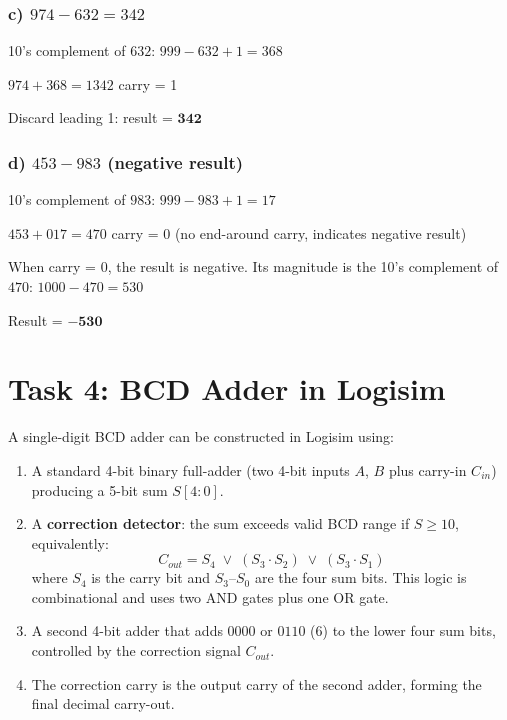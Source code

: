 \documentclass[12pt,a4paper]{article}
\begin{document}
\subsubsection*{c) \quad $974 - 632 = 342$}

10's complement of $632$: \quad $999 - 632 + 1 = 368$

$974 + 368 = 1342$ \quad carry = 1

Discard leading 1: result = $\mathbf{342}$

\subsubsection*{d) \quad $453 - 983$ (negative result)}

10's complement of $983$: \quad $999 - 983 + 1 = 17$

$453 + 017 = 470$ \quad carry = 0 (no end-around carry, indicates negative result)

When carry = 0, the result is negative. Its magnitude is the 10's complement
of $470$: \quad $1000 - 470 = 530$

Result = $\mathbf{-530}$

\newpage

\section{Task 4: BCD Adder in Logisim}

A single-digit BCD adder can be constructed in Logisim using:

\begin{enumerate}
  \item A standard 4-bit binary full-adder (two 4-bit inputs $A$, $B$ plus
        carry-in $C_{in}$) producing a 5-bit sum $S[4:0]$.
  \item A \textbf{correction detector}: the sum exceeds valid BCD range if
        $S \geq 10$, equivalently:
        \[ C_{out} = S_4 \;\vee\; (S_3 \cdot S_2) \;\vee\; (S_3 \cdot S_1) \]
        where $S_4$ is the carry bit and $S_3$--$S_0$ are the four sum bits.
        This logic is combinational and uses two AND gates plus one OR gate.
  \item A second 4-bit adder that adds $0000$ or $0110$ (6) to the lower four
        sum bits, controlled by the correction signal $C_{out}$.
  \item The correction carry is the output carry of the second adder, forming
        the final decimal carry-out.
\end{enumerate}
\end{document}
